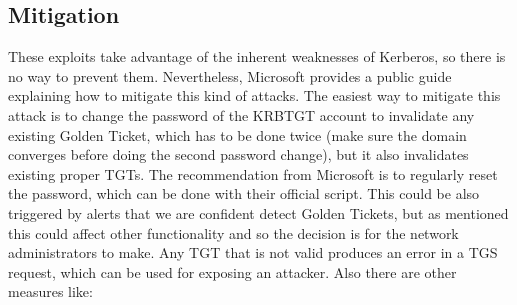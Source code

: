 \subsection{Mitigation}
These exploits take advantage of the inherent weaknesses of Kerberos, so there is no way to prevent them. Nevertheless, Microsoft provides a public guide explaining how to mitigate this kind of attacks\cite{microsoft_mitigation}.
The easiest way to mitigate this attack is to change the password of the KRBTGT account to invalidate any existing Golden Ticket, which has to be done twice (make sure the domain converges before doing the second password change\cite{hood}), but it also invalidates existing proper TGTs.
\linej
The recommendation from Microsoft is to regularly reset the password\cite{tarlogic_comprehension}\cite{adsecurity_483}, which can be done with their official script\cite{reset_script}. This could be also triggered by alerts that we are confident detect Golden Tickets, but as mentioned this could affect other functionality and so the decision is for the network administrators to make. Any TGT that is not valid produces an error in a TGS request, which can be used for exposing an attacker\cite{scom_GT}.
\linej
\linej
Also there are other measures like:
